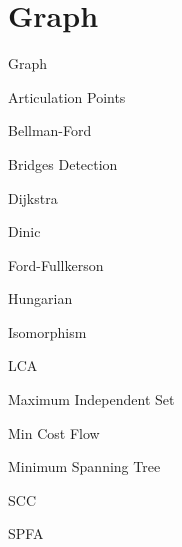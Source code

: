 \section{Graph}

Graph


Articulation Points


Bellman-Ford


Bridges Detection


Dijkstra


Dinic


Ford-Fullkerson


Hungarian


Isomorphism


LCA


Maximum Independent Set


Min Cost Flow


Minimum Spanning Tree


SCC


SPFA


